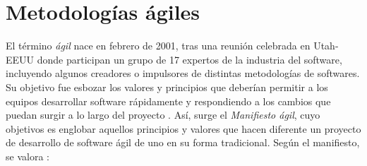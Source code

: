 \section{Metodologías ágiles}

El término \textit{ágil} nace en febrero de 2001, tras una reunión celebrada en Utah-EEUU donde participan un grupo de 17 expertos de la industria del software, incluyendo algunos creadores o impulsores de distintas metodologías de softwares. Su objetivo fue esbozar los valores y principios que deberían permitir a los equipos desarrollar software rápidamente y respondiendo a los cambios que puedan surgir a lo largo del proyecto \parencite{canos2012}. Así, surge el \textit{Manifiesto ágil}, cuyo objetivos es englobar aquellos principios y valores que hacen diferente un proyecto de desarrollo de software ágil de uno en su forma tradicional. Según el manifiesto, se valora \parencite{canos2012}:

